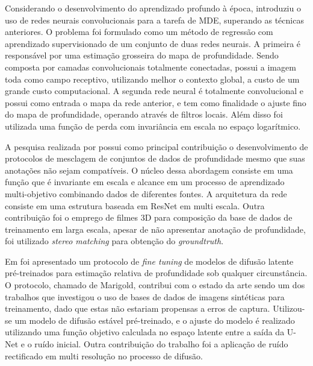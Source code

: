 Considerando o desenvolvimento do aprendizado profundo à época,  introduziu o uso de redes neurais convolucionais para a tarefa de MDE, superando as técnicas anteriores. O problema foi formulado como um método de regressão com aprendizado supervisionado de um conjunto de duas redes neurais. A primeira é responsável por uma estimação grosseira do mapa de profundidade. Sendo composta por camadas convolucionais totalmente conectadas, possui a imagem toda como campo receptivo, utilizando melhor o contexto global, a custo de um grande custo computacional. A segunda rede neural é totalmente convolucional e possui como entrada o mapa da rede anterior, e tem como finalidade o ajuste fino do mapa de profundidade, operando através de filtros locais. Além disso foi utilizada uma função de perda com invariância em escala no espaço logarítmico.

A pesquisa realizada por  possui como principal contribuição o desenvolvimento de protocolos de mesclagem de conjuntos de dados de profundidade mesmo que suas anotações não sejam compatíveis. O núcleo dessa abordagem consiste em uma função que é invariante em escala e alcance em um processo de aprendizado multi-objetivo combinando dados de diferentes fontes. A arquitetura da rede consiste em uma estrutura baseada em ResNet em multi escala. Outra contribuição foi o emprego de filmes 3D para composição da base de dados de treinamento em larga escala, apesar de não apresentar anotação de profundidade, foi utilizado \textit{stereo matching} para obtenção do \textit{groundtruth}. 

Em \cite{ke2024repurposing} foi apresentado um protocolo de \textit{fine tuning} de modelos de difusão latente pré-treinados para estimação relativa de profundidade sob qualquer circunstância. O protocolo, chamado de Marigold, contribui com o estado da arte sendo um dos trabalhos que investigou o uso de bases de dados de imagens sintéticas para treinamento, dado que estas não estariam propensas a erros de captura. Utilizou-se um modelo de difusão estável pré-treinado, e o ajuste do modelo é realizado utilizando uma função objetivo calculada no espaço latente entre a saída da U-Net e o ruído inicial. Outra contribuição do trabalho foi a aplicação de ruído rectificado em multi resolução no processo de difusão. 
